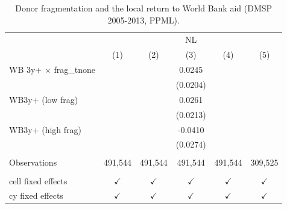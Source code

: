 
\begin{table}[htbp]
   \caption{Donor fragmentation and the local return to World Bank aid (DMSP 2005-2013, PPML).}
   \bigskip
   \centering
   \begin{tabular}{lccccc}
      \toprule
       & \multicolumn{5}{c}{NL}\\
                                    & (1)           & (2)           & (3)           & (4)           & (5)\\  
      \midrule 
      WB 3y+ $\times$ frag\_tnone   &               &               & 0.0245        &               &   \\   
                                    &               &               & (0.0204)      &               &   \\   
      WB3y+ (low frag)              &               &               & 0.0261        &               &   \\   
                                    &               &               & (0.0213)      &               &   \\   
      WB3y+ (high frag)             &               &               & -0.0410       &               &   \\   
                                    &               &               & (0.0274)      &               &   \\   
       \\
      Observations                  & 491,544       & 491,544       & 491,544       & 491,544       & 309,525\\  
       \\
      cell fixed effects            & $\checkmark$  & $\checkmark$  & $\checkmark$  & $\checkmark$  & $\checkmark$\\   
      cy fixed effects              & $\checkmark$  & $\checkmark$  & $\checkmark$  & $\checkmark$  & $\checkmark$\\   
      \bottomrule
   \end{tabular}
\end{table}


